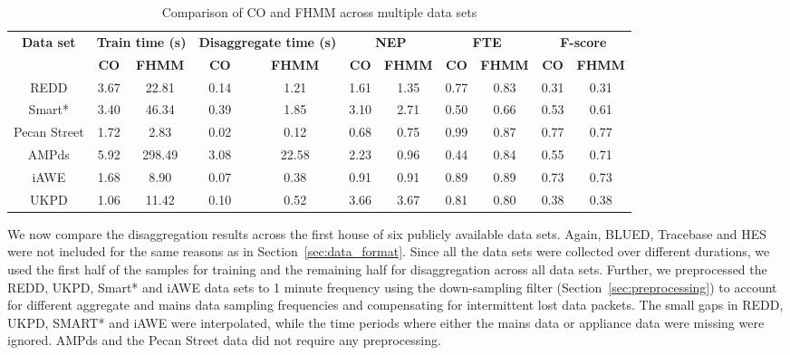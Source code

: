 \documentclass{sig-alternate}
\newcommand{\bluecolor}[1]{\textcolor{blue}{#1}}
\newcommand{\secref}[1]{Section~\ref{#1}}
\begin{document}
\begin{table}
\centering
\begin{tabular}{ccccccccccc}
\hline\textbf{Data set} & \multicolumn{2}{c}{\textbf{Train time (s)}}& \multicolumn{2}{c}{\textbf{Disaggregate time (s)}} &\multicolumn{2}{c}{\textbf{NEP}}    & \multicolumn{2}{c}{\textbf{FTE}} &\multicolumn{2}{c}{\textbf{F-score}} \\ 
~ &\textbf{CO} & \textbf{FHMM} &\textbf{CO} & \textbf{FHMM} &\textbf{CO} & \textbf{FHMM} &\textbf{CO} & \textbf{FHMM}&\textbf{CO} & \textbf{FHMM} \\ \hline 
REDD &3.67 &22.81 &0.14 &1.21 &1.61 &1.35 &0.77 &0.83 &0.31 &0.31\\ 
Smart* &3.40 &46.34 &0.39 &1.85 &3.10 &2.71 &0.50 &0.66 &0.53 &0.61\\ 
Pecan Street &1.72 &2.83 &0.02 &0.12 &0.68 &0.75 &0.99 &0.87 &0.77 &0.77\\ 
AMPds &5.92 &298.49 &3.08 &22.58 &2.23 &0.96 &0.44 &0.84 &0.55 &0.71\\ 
iAWE &1.68 &8.90 &0.07 &0.38 &0.91 &0.91 &0.89 &0.89 &0.73 &0.73\\ 
UKPD &1.06 &11.42 &0.10 &0.52 &3.66 &3.67 &0.81 &0.80 &0.38 &0.38\\
\hline
\end{tabular}
\caption{Comparison of CO and FHMM across multiple data sets}
\label{table:disaggregation}
\end{table}

\noindent
We now compare the disaggregation results across the first house of six publicly available data sets. Again, BLUED, Tracebase and HES were not included for the same reasons as in \secref{sec:data_format}. Since all the data sets were collected over different durations, we used the first half of the samples for training and the remaining half for disaggregation across all data sets. Further, we preprocessed  the REDD, UKPD, Smart* and iAWE data sets to 1 minute frequency using the down-sampling filter (\secref{sec:preprocessing}) to account for different aggregate and mains data sampling frequencies and compensating for intermittent lost data packets. The small gaps in REDD, UKPD, SMART* and iAWE were interpolated, while the time periods where either the mains data or appliance data were missing were ignored. AMPds and the Pecan Street data did not require any preprocessing. 
\end{document}
